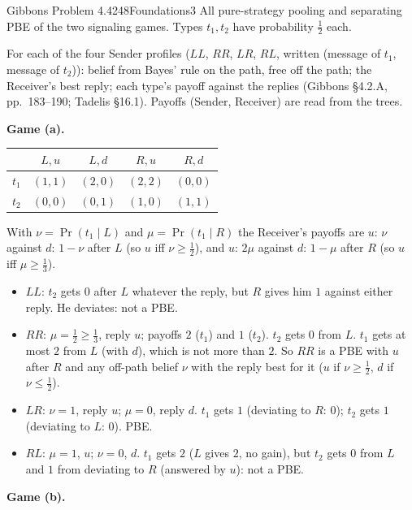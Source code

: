 \begin{exsol}{Gibbons Problem 4.4}{248}{Foundations}{3}
\asked All pure-strategy pooling and separating PBE of the two signaling games. Types $t_1, t_2$
have probability $\frac12$ each.

\method For each of the four Sender profiles ($LL$, $RR$, $LR$, $RL$, written (message of $t_1$,
message of $t_2$)): belief from Bayes' rule on the path, free off the path; the Receiver's best
reply; each type's payoff against the replies (Gibbons \S4.2.A, pp.~183--190; Tadelis \S16.1).
Payoffs (Sender, Receiver) are read from the trees.

\solution \textbf{Game (a).}
\begin{center}
\begin{tabular}{lcccc}
\toprule
 & $L,u$ & $L,d$ & $R,u$ & $R,d$ \\
\midrule
$t_1$ & $(1,1)$ & $(2,0)$ & $(2,2)$ & $(0,0)$ \\
$t_2$ & $(0,0)$ & $(0,1)$ & $(1,0)$ & $(1,1)$ \\
\bottomrule
\end{tabular}
\end{center}
With $\nu = \Pr(t_1 \mid L)$ and $\mu = \Pr(t_1 \mid R)$ the Receiver's payoffs are $u$: $\nu$ against
$d$: $1 - \nu$ after $L$ (so $u$ iff $\nu \ge \frac12$), and $u$: $2\mu$ against $d$: $1 - \mu$ after $R$
(so $u$ iff $\mu \ge \frac13$).
\begin{itemize}
  \item $LL$: $t_2$ gets $0$ after $L$ whatever the reply, but $R$ gives him $1$ against either
  reply. He deviates: not a PBE.
  \item $RR$: $\mu = \frac12 \ge \frac13$, reply $u$; payoffs $2$ ($t_1$) and $1$ ($t_2$). $t_2$
  gets $0$ from $L$. $t_1$ gets at most $2$ from $L$ (with $d$), which is not more than $2$. So
  $RR$ is a PBE with $u$ after $R$ and any off-path belief $\nu$ with the reply best for it ($u$ if
  $\nu \ge \frac12$, $d$ if $\nu \le \frac12$).
  \item $LR$: $\nu = 1$, reply $u$; $\mu = 0$, reply $d$. $t_1$ gets $1$ (deviating to $R$: $0$);
  $t_2$ gets $1$ (deviating to $L$: $0$). PBE.
  \item $RL$: $\mu = 1$, $u$; $\nu = 0$, $d$. $t_1$ gets $2$ ($L$ gives $2$, no gain), but $t_2$ gets
  $0$ from $L$ and $1$ from deviating to $R$ (answered by $u$): not a PBE.
\end{itemize}
\textbf{Game (b).}
\begin{center}

\end{center}
\end{exsol}
